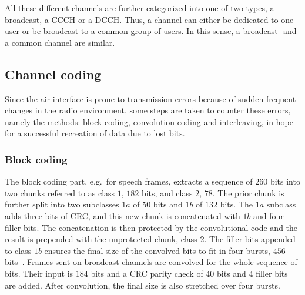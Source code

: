 All these different channels are further categorized into one of two
types, a broadcast, a \gls{CCCH} or a \gls{DCCH}. Thus, a channel can
either be dedicated to one user or be broadcast to a common group of
users. In this sense, a broadcast- and a common channel are similar.

\subsection{Channel coding}
\label{sec:channel_coding}
Since the air interface is prone to transmission errors because of
sudden frequent changes in the radio environment, some steps are taken
to counter these errors, namely the methods: block coding, convolution
coding and interleaving, in hope for a successful recreation of data
due to lost bits.

\subsubsection{Block coding}
The block coding part, e.g.\ for speech frames, extracts a sequence of
$260$ bits into two chunks referred to as class $1$, $182$ bits, and
class $2$, $78$. The prior chunk is further split into two subclasses
$1a$ of $50$ bits and $1b$ of $132$ bits. The $1a$ subclass adds three
bits of \gls{CRC}, and this new chunk is concatenated with $1b$ and
four filler bits. The concatenation is then protected by the
convolutional code and the result is prepended with the unprotected
chunk, class $2$. The filler bits appended to class $1b$ ensures the
final size of the convolved bits to fit in four bursts, $456$
bits~\cite[p. 17]{coding}. Frames sent on broadcast channels are convolved
for the whole sequence of bits. Their input is $184$ bits and a
\gls{CRC} parity check of $40$ bits and $4$ filler bits are
added. After convolution, the final size is also stretched over four
bursts.

